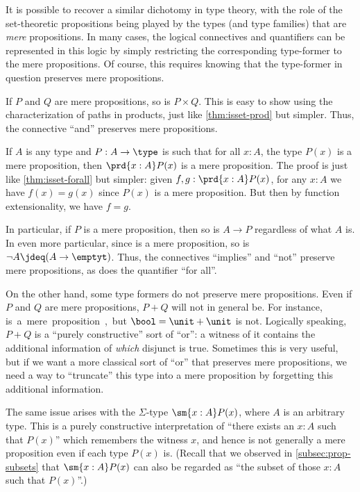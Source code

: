 It is possible to recover a similar dichotomy in type theory, with the role of the set-theoretic propositions being played by the types (and type families) that are \emph{mere} propositions.
In many cases, the logical connectives and quantifiers can be represented in this logic by simply restricting the corresponding type-former to the mere propositions.
Of course, this requires knowing that the type-former in question preserves mere propositions.

\begin{eg}
  If $P$ and $Q$ are mere propositions, so is $P\times Q$.
  This is easy to show using the characterization of paths in products, just like \cref{thm:isset-prod} but simpler.
  Thus, the connective ``and'' preserves mere propositions.
\end{eg}

\begin{eg}\label{thm:isprop-forall}
  If $A$ is any type and $P:A\to \type$ is such that for all $x:A$, the type $P(x)$ is a mere proposition, then $\prd{x:A} P(x)$ is a mere proposition.
  The proof is just like \cref{thm:isset-forall} but simpler: given $f,g:\prd{x:A} P(x)$, for any $x:A$ we have $f(x)=g(x)$ since $P(x)$ is a mere proposition.
  But then by function extensionality, we have $f=g$.

  In particular, if $P$ is a mere proposition, then so is $A\to P$ regardless of what $A$ is.
  In even more particular, since \emptyt is a mere proposition, so is $\neg A \jdeq (A\to\emptyt)$.
  Thus, the connectives ``implies'' and ``not'' preserve mere propositions, as does the quantifier ``for all''.
\end{eg}

On the other hand, some type formers do not preserve mere propositions.
Even if $P$ and $Q$ are mere propositions, $P+Q$ will not in general be.
For instance, \unit is a mere proposition, but $\bool=\unit+\unit$ is not.
Logically speaking, $P+Q$ is a ``purely constructive'' sort of ``or'': a witness of it contains the additional information of \emph{which} disjunct is true.
Sometimes this is very useful, but if we want a more classical sort of ``or'' that preserves mere propositions, we need a way to ``truncate'' this type into a mere proposition by forgetting this additional information.

%
The same issue arises with the $\Sigma$-type $\sm{x:A} P(x)$, where $A$ is an arbitrary type.
This is a purely constructive interpretation of ``there exists an $x:A$ such that $P(x)$'' which remembers the witness $x$, and hence is not generally a mere proposition even if each type $P(x)$ is.
(Recall that we observed in \cref{subsec:prop-subsets} that $\sm{x:A} P(x)$ can also be regarded as ``the subset of those $x:A$ such that $P(x)$''.)


